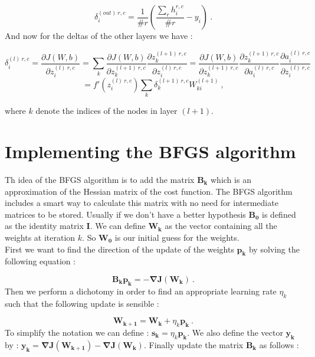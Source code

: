\documentclass[a4paper,12pt,twoside]{article}
\newcommand{\matr}[1] {\bm{#1}}
\begin{document}
\begin{equation}
\delta^{(out)~r,c}_i = \frac{1}{\# r}\left(\frac{\sum_r h_i^{r,c}}{\# r} - y_i \right)~.
\end{equation}
And now for the deltas of the other layers we have :

\begin{equation}
\delta^{(l)~r,c}_i = \frac{\partial J(W,b)}{\partial z^{(l)~r,c}_i} = \sum_k \frac{\partial J(W,b)}{\partial z^{(l+1)~r,c}_k}\frac{\partial z^{(l+1)~r,c}_k}{\partial z^{(l)~r,c}_i} = \frac{\partial J(W,b)}{\partial z^{(l+1)~r,c}_k}\frac{\partial z^{(l+1)~r,c}_k}{\partial a^{(l)~r,c}_i} \frac{\partial a^{(l)~r,c}_i}{\partial z^{(l)~r,c}_i} 
\end{equation}
\[
= f'(z^{(l)~r,c}_i) \sum_k \delta^{(l+1)~r,c}_k W^{(l+1)}_{ki}~,
\]

where $k$ denote the indices of the nodes in layer $(l+1)$.

\section{Implementing the BFGS algorithm}

Th idea of the BFGS algorithm is to add the matrix $\matr{B_k}$ which is an approximation of the Hessian matrix of the cost function. The BFGS algorithm includes a smart way to calculate this matrix with no need for intermediate matrices to be stored. Usually if we don't have a better hypothesis $\matr{B_0}$ is defined as the identity matrix $\matr{I}$.
We can define $\mathbf{W_k}$ as the vector containing all the weights at iteration $k$. So $\mathbf{W_0}$ is our initial guess for the weights.  \\
First we want to find the direction of the update of the weights $\mathbf{p_k}$ by solving the following equation :  

\begin{equation}
\matr{B_k} \mathbf{p_k} = - \mathbf{\nabla J (\mathbf{W_k})}~.
\end{equation} 
Then we perform a dichotomy in order to find an appropriate learning rate $\eta_k$ such that the following update is sensible :

\begin{equation}
\mathbf{W_{k+1}} = \mathbf{W_k} + \eta_k \mathbf{p_k}~.
\end{equation} 
To simplify the notation we can define : $\mathbf{s_k} = \eta_k  \mathbf{p_k}$. We also define the vector $\mathbf{y_k}$ by : $\mathbf{y_k} = \mathbf{\nabla J (\mathbf{W_{k+1}})} - \mathbf{\nabla J (\mathbf{W_k})}$.
Finally update the matrix $\matr{B_k}$ as follows :
\end{document}
